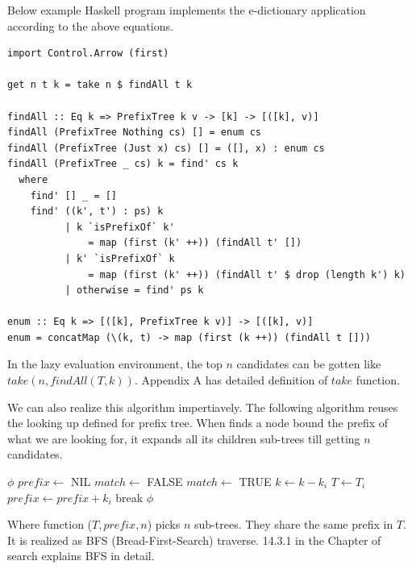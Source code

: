 \documentclass[b5paper]{article}
\begin{document}
Below example Haskell program implements the e-dictionary application
according to the above equations.

\lstset{language=Haskell}
\begin{lstlisting}
import Control.Arrow (first)

get n t k = take n $ findAll t k

findAll :: Eq k => PrefixTree k v -> [k] -> [([k], v)]
findAll (PrefixTree Nothing cs) [] = enum cs
findAll (PrefixTree (Just x) cs) [] = ([], x) : enum cs
findAll (PrefixTree _ cs) k = find' cs k
  where
    find' [] _ = []
    find' ((k', t') : ps) k
          | k `isPrefixOf` k'
              = map (first (k' ++)) (findAll t' [])
          | k' `isPrefixOf` k
              = map (first (k' ++)) (findAll t' $ drop (length k') k)
          | otherwise = find' ps k

enum :: Eq k => [([k], PrefixTree k v)] -> [([k], v)]
enum = concatMap (\(k, t) -> map (first (k ++)) (findAll t []))
\end{lstlisting}

In the lazy evaluation environment, the top $n$ candidates can be
gotten like $take(n, findAll(T, k))$. Appendix A has detailed definition
of $take$ function.

We can also realize this algorithm impertiavely.
The following algorithm reuses the looking up defined for prefix tree. When
finds a node bound the prefix of what we are looking for,
it expands all its children sub-trees till getting $n$ candidates.

\begin{algorithmic}[1]
     \State \Return $\phi$
  \EndIf
  \State $prefix \gets$ NIL
  \Repeat
    \State $match \gets$ FALSE
        \State \Return {}
      \EndIf
        \State $match \gets$ TRUE
        \State $k \gets k - k_i$
        \State $T \gets T_i$
        \State $prefix \gets prefix + k_i$
        \State break
      \EndIf
    \EndFor
  \State \Return $\phi$
\EndFunction
\end{algorithmic}

Where function ($T, prefix, n$) picks $n$ sub-trees. They
share the same prefix in $T$. It is realized as BFS (Bread-First-Search) traverse. 14.3.1 in the Chapter of search explains BFS in detail.
\end{document}

